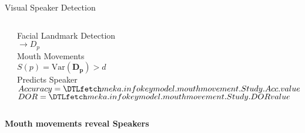 \begin{frame}{Visual Speaker Detection}
  \begin{columns}[T] %
    \begin{column}{.64\textwidth}
    \end{column}%
    \begin{column}{.35\textwidth}
      \vspace{15pt}
      \small
      Facial Landmark Detection\\
      \hspace{20pt}\(\rightarrow D_p\)\\
      \vspace{5pt}
      \pause
      Mouth Movements\\
      \hspace{20pt}\(S(p) = \text{Var}(\mathbf{D_p}) > d\)\\
      \vspace{5pt}
      \pause
      Predicts Speaker\\
      \hspace{20pt}\(Accuracy = \inidata{meka.info}{model.mouthmovement.Study.Acc.}\)\\
      \hspace{20pt}\(DOR = \inidata{meka.info}{model.mouthmovement.Study.DOR}\)\\
      \vspace{5pt}
    \end{column}%
    \end{columns}
    \centering
    \pause
      \textcolor{mygreen}{\faCheckCircle} \textbf{Mouth movements reveal Speakers}\\
\end{frame}
